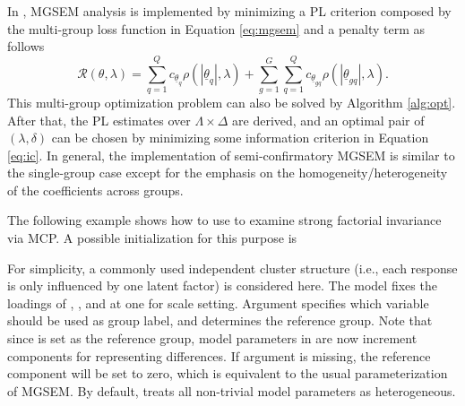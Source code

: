 \documentclass[nojss]{jss}
\begin{document}
In , MGSEM analysis is implemented by minimizing a PL criterion composed by the multi-group loss function in Equation \ref{eq:mgsem} and a penalty term as follows 
%
\begin{equation}
\mathcal{R}(\theta, \lambda) = \sum_{q=1}^{Q} c_{\underline{\theta}_{q}}\rho(|\underline{\theta}_{q}|, \lambda)+ \sum_{g=1}^{G} \sum_{q=1}^{Q} c_{\underline{\theta}_{gq}}\rho(|\underline{\theta}_{gq}|, \lambda).
\end{equation}
%
This multi-group optimization problem can also be solved by Algorithm \ref{alg:opt}. After that, the PL estimates over $\Lambda \times \Delta$ are derived, and an optimal pair of $(\lambda, \delta)$ can be chosen by minimizing some information criterion in Equation \ref{eq:ic}. In general, the implementation of semi-confirmatory MGSEM is similar to the single-group case except for the emphasis on the homogeneity/heterogeneity of the coefficients across groups.

The following example shows how to use  to examine strong factorial invariance via MCP. A possible initialization for this purpose is
\begin{Schunk}
\end{Schunk}
For simplicity, a commonly used independent cluster structure (i.e., each response is only influenced by one latent factor) is considered here. The model fixes the loadings of , , and  at one for scale setting. Argument  specifies which variable should be used as group label, and  determines the reference group. Note that since  is set as the reference group, model parameters in  are now increment components for representing differences. If argument  is missing, the reference component will be set to zero, which is equivalent to the usual parameterization of MGSEM. By default,  treats all non-trivial model parameters as heterogeneous.
\end{document}
